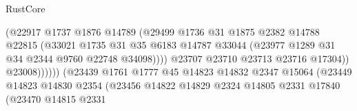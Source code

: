 \begin{lexlean}{RustCore}
\begin{coremodule}
                                            (@22917
                                              @1737
                                              @1876
                                              @14789
                                              (@29499
                                                @1736
                                                @31
                                                @1875
                                                @2382
                                                @14788
                                                @22815
                                                (@33021
                                                  @1735
                                                  @31
                                                  @35
                                                  @6183
                                                  @14787
                                                  @33044
                                                  (@23977
                                                    @1289
                                                    @31
                                                    @34
                                                    @2344
                                                    @9760
                                                    @22748
                                                    @34098))))
                                            @23707
                                            @23710
                                            @23713
                                            @23716
                                            @17304))
                                        @23008))))))
                            (@23439
                              @1761
                              @1777
                              @45
                              @14823
                              @14832
                              @2347
                              @15064
                              (@23449
                                @14823
                                @14830
                                @2354
                                (@23456
                                  @14822
                                  @14829
                                  @2324
                                  @14805
                                  @2331
                                  @17840
                                  (@23470
                                    @14815
                                    @2331

\end{coremodule}
\end{lexlean}
